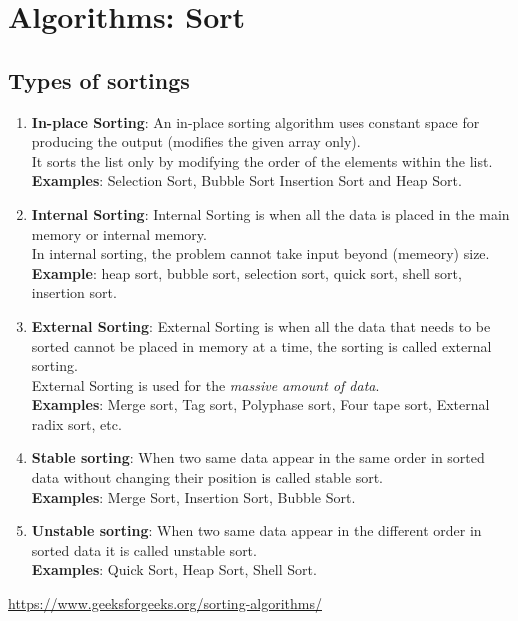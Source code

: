 \chapter{Algorithms: Sort}

\section{Types of sortings \cite{gfg-sorting-algorithms}}
\begin{enumerate}
    \item \textbf{In-place Sorting}: An in-place sorting algorithm uses constant space for producing the output (modifies the given array only).\\
    It sorts the list only by modifying the order of the elements within the list.\\
    \textbf{Examples}: Selection Sort, Bubble Sort Insertion Sort and Heap Sort.

    \item \textbf{Internal Sorting}: Internal Sorting is when all the data is placed in the main memory or internal memory.\\
    In internal sorting, the problem cannot take input beyond (memeory) size.\\
    \textbf{Example}: heap sort, bubble sort, selection sort, quick sort, shell sort, insertion sort.

    \item \textbf{External Sorting}: External Sorting is when all the data that needs to be sorted cannot be placed in memory at a time, the sorting is called external sorting.\\
    External Sorting is used for the \textit{massive amount of data}.\\
    \textbf{Examples}: Merge sort, Tag sort, Polyphase sort, Four tape sort, External radix sort, etc.

    \item \textbf{Stable sorting}: When two same data appear in the same order in sorted data without changing their position is called stable sort. \\
    \textbf{Examples}: Merge Sort, Insertion Sort, Bubble Sort.

    \item \textbf{Unstable sorting}: When two same data appear in the different order in sorted data it is called unstable sort.\\
    \textbf{Examples}: Quick Sort, Heap Sort, Shell Sort.

\end{enumerate}

\vspace{4cm}
\url{https://www.geeksforgeeks.org/sorting-algorithms/}




